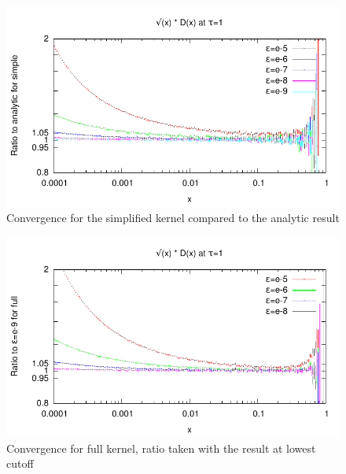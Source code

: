 \documentclass[a4paper,12pt]{article}
\numberwithin{equation}{section}
\begin{document}
\begin{figure}
\centering
\includegraphics[width=0.8\linewidth]{convergence.pdf}
\caption{Convergence for the simplified kernel compared to the analytic result}\label{convergence}
\end{figure}

\begin{figure}
\centering
\includegraphics[width=0.8\linewidth]{convergence_full.pdf}
\caption{Convergence for full kernel, ratio taken with the result at lowest cutoff}\label{convergence_full}
\end{figure}
\end{document}
